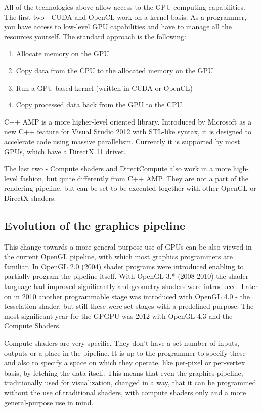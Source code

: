All of the technologies above allow access to the GPU computing capabilities. The first two - CUDA and OpenCL work on a kernel basis. As a programmer, you have access to low-level GPU capabilities and have to manage all the resources yourself. The standard approach is the following:

\begin{enumerate}
	\item Allocate memory on the GPU
	\item Copy data from the CPU to the allocated memory on the GPU
	\item Run a GPU based kernel (written in CUDA or OpenCL)
	\item Copy processed data back from the GPU to the CPU
\end{enumerate}

C++ AMP is a more higher-level oriented library. Introduced by Microsoft as a new C++ feature for Visual Studio 2012 with STL-like syntax, it is designed to accelerate code using massive parallelism. Currently it is supported by most GPUs, which have a DirectX 11 driver.

The last two - Compute shaders and DirectCompute also work in a more high-level fashion, but quite differently from C++ AMP. They are not a part of the rendering pipeline, but can be set to be executed together with other OpenGL or DirectX shaders.

\subsection{Evolution of the graphics pipeline}

This change towards a more general-purpose use of GPUs can be also viewed in the current OpenGL pipeline, with which most graphics programmers are familiar. In OpenGL 2.0 (2004) shader programs were introduced enabling to partially program the pipeline itself. With OpenGL 3.* (2008-2010) the shader language had improved significantly and geometry shaders were introduced. Later on in 2010 another programmable stage was introduced with OpenGL 4.0 - the tesselation shader, but still these were set stages with a predefined purpose. The most significant year for the GPGPU was 2012 with OpenGL 4.3 and the Compute Shaders. 

Compute shaders are very specific. They don't have a set number of inputs, outputs or a place in the pipeline. It is up to the programmer to specify these and also to specify a space on which they operate, like per-pixel or per-vertex basis, by fetching the data itself. This means that even the graphics pipeline, traditionally used for visualization, changed in a way, that it can be programmed without the use of traditional shaders, with compute shaders only and a more general-purpose use in mind.

